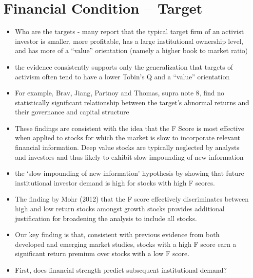 \documentclass[12pt]{article}
\begin{document}
\section{Financial Condition -- Target}

    \begin{itemize}

        \item Who are the targets - many report that the typical target firm of an activist investor is smaller, more profitable, has a large institutional ownership level, and has more of a “value” orientation (namely a higher book to market ratio) \citep{CoffeeJr.2014}

        \item the evidence consistently supports only the generalization that targets of activism often tend to have a lower Tobin’s Q and a “value” orientation \citep{CoffeeJr.2014}

        \item For example, Brav, Jiang, Partnoy and Thomas, supra note 8, find no statistically significant relationship between the target’s abnormal returns and their governance and capital structure \citep{CoffeeJr.2014}

        \item These findings are consistent with the idea that the F Score is most effective when applied to stocks for which the market is slow to incorporate relevant financial information. Deep value stocks are typically neglected by analysts and investors and thus likely to exhibit slow impounding of new information \citep{Hyde2014}

        \item the ‘slow impounding of new information’ hypothesis by showing that future institutional investor demand is high for stocks with high F scores. \citep{Hyde2014}

        \item The finding by Mohr (2012) that the F score effectively discriminates between high and low return stocks amongst growth stocks provides additional justification for broadening the analysis to include all stocks. \citep{Hyde2014}

        \item Our key finding is that, consistent with previous evidence from both developed and emerging market studies, stocks with a high F score earn a significant return premium over stocks with a low F score.\citep{Hyde2014}

        \item First, does financial strength predict subsequent institutional demand? \citep{Choi2012}


\end{itemize}
\end{document}
